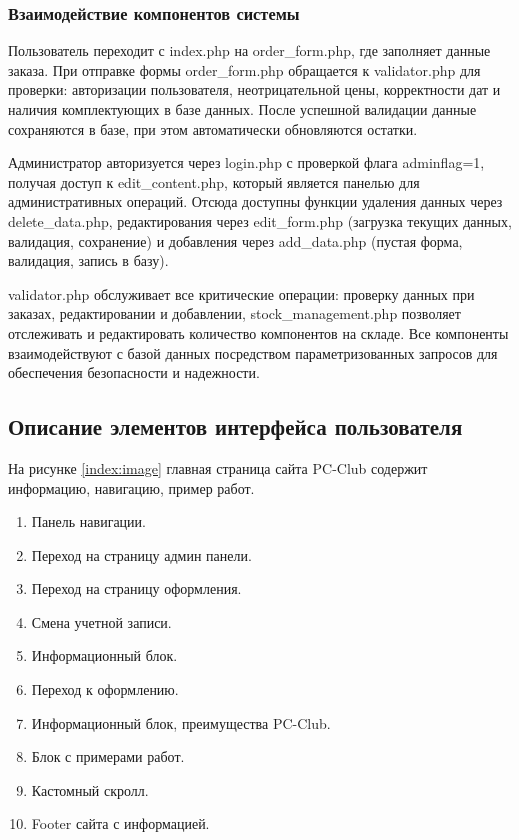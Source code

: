 \subsubsection{Взаимодействие компонентов системы}
Пользователь переходит с index.php на order\_form.php, где заполняет данные заказа. При отправке формы order\_form.php обращается к validator.php для проверки: авторизации пользователя, неотрицательной цены, корректности дат и наличия комплектующих в базе данных. После успешной валидации данные сохраняются в базе, при этом автоматически обновляются остатки.

Администратор авторизуется через login.php с проверкой флага adminflag=1, получая доступ к edit\_content.php, который является панелью для административных операций. Отсюда доступны функции удаления данных через delete\_data.php, редактирования через edit\_form.php (загрузка текущих данных, валидация, сохранение) и добавления через add\_data.php (пустая форма, валидация, запись в базу).

validator.php обслуживает все критические операции: проверку данных при заказах, редактировании и добавлении, stock\_management.php позволяет отслеживать и редактировать количество компонентов на складе. Все компоненты взаимодействуют с базой данных посредством параметризованных запросов для обеспечения безопасности и надежности.



\newpage 
\subsection{Описание элементов интерфейса пользователя}

На рисунке \ref{index:image} главная страница сайта PC-Club содержит информацию, навигацию, пример работ.

\begin{enumerate}
	\item Панель навигации.
	\item Переход на страницу админ панели.
	\item Переход на страницу оформления.
	\item Смена учетной записи.
	\item Информационный блок.
	\item Переход к оформлению.
	\item Информационный блок, преимущества PC-Club.
	\item Блок с примерами работ.
	\item Кастомный скролл.
	\item Footer сайта с информацией.
\end{enumerate}

